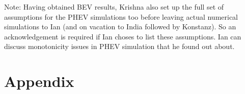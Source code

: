 Note: Having obtained BEV results, Krishna also set up the full set of
assumptions for the PHEV simulations too before leaving actual numerical
simulations to Ian (and on vacation to India followed by Konstanz). So an
acknowledgement is required if Ian choses to list these assumptions. Ian can
discuss monotonicity issues in PHEV simulation that he found out about.

\section{Appendix}
